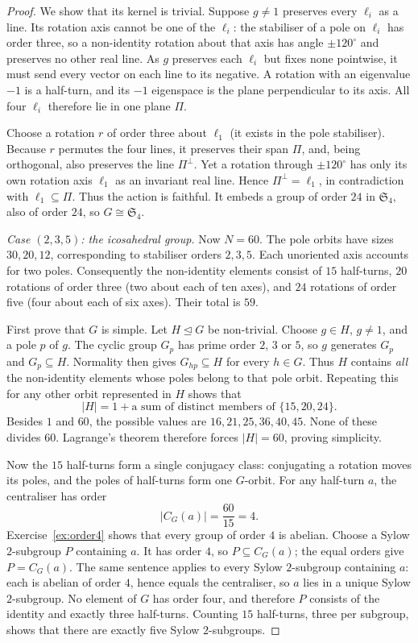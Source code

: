 \begin{proof}
We show that its kernel is trivial.
Suppose $g\ne1$ preserves every
$\ell_i$ as a line. Its rotation
axis cannot be one of the $\ell_i$:
the stabiliser of a pole on
$\ell_i$ has order three, so
a non-identity rotation about
that axis has angle $\pm120^\circ$
and preserves no other real line.
As $g$ preserves each $\ell_i$
but fixes none pointwise, it
must send every vector on each
line to its negative. A rotation
with an eigenvalue $-1$ is a
half-turn, and its $-1$ eigenspace
is the plane perpendicular to
its axis. All four $\ell_i$
therefore lie in one plane
$\Pi$.

Choose a rotation $r$ of order
three about $\ell_1$ (it exists
in the pole stabiliser).
Because $r$ permutes the four
lines, it preserves their span
$\Pi$, and, being orthogonal,
also preserves the line
$\Pi^\perp$. Yet a rotation
through $\pm120^\circ$ has
only its own rotation axis
$\ell_1$ as an invariant
real line. Hence
$\Pi^\perp=\ell_1$, in
contradiction with
$\ell_1\subseteq\Pi$.
Thus the action is faithful.
It embeds a group of order
$24$ in $\mathfrak S_4$, also
of order $24$, so
$G\cong\mathfrak S_4$.

\emph{Case $(2,3,5)$: the icosahedral group.}
Now $N=60$. The pole orbits have
sizes $30,20,12$, corresponding
to stabiliser orders $2,3,5$.
Each unoriented axis accounts
for two poles. Consequently the
non-identity elements consist
of $15$ half-turns, $20$
rotations of order three
(two about each of ten axes),
and $24$ rotations of order
five (four about each of six
axes). Their total is $59$.

First prove that $G$ is simple.
Let $H\trianglelefteq G$ be
non-trivial. Choose $g\in H$,
$g\ne1$, and a pole $p$ of $g$.
The cyclic group $G_p$ has prime
order $2$, $3$ or $5$, so
$g$ generates $G_p$ and
$G_p\subseteq H$. Normality
then gives $G_{hp}\subseteq H$
for every $h\in G$. Thus
$H$ contains \emph{all} the
non-identity elements whose
poles belong to that pole
orbit. Repeating this for any
other orbit represented in $H$
shows that
\[
|H|=1+\text{a sum of distinct
members of }\{15,20,24\}.
\]
Besides $1$ and $60$, the
possible values are
$16,21,25,36,40,45$.
None of these divides $60$.
Lagrange's theorem therefore
forces $|H|=60$, proving
simplicity.

Now the $15$ half-turns form
a single conjugacy class:
conjugating a rotation moves
its poles, and the poles of
half-turns form one $G$-orbit.
For any half-turn $a$, the
centraliser has order
\[
|C_G(a)|=\frac{60}{15}=4.
\]
Exercise~\ref{ex:order4} shows that every group of order $4$ is abelian. Choose a Sylow $2$-subgroup $P$ containing $a$. It has order $4$, so $P\subseteq C_G(a)$; the equal orders give $P=C_G(a)$. The same sentence applies to every Sylow $2$-subgroup containing $a$: each is abelian of order $4$, hence equals the centraliser, so $a$ lies in a unique Sylow $2$-subgroup. No element of $G$ has order four, and therefore $P$ consists of the identity and exactly three half-turns. Counting
$15$ half-turns, three
per subgroup, shows that
there are exactly five
Sylow $2$-subgroups.


\end{proof}
